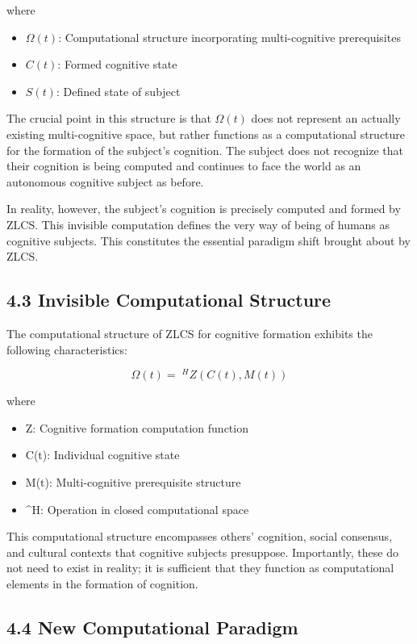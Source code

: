 \documentclass{article}
\begin{document}
where
\begin{itemize}
    \item $\Omega(t)$: Computational structure incorporating multi-cognitive prerequisites
    \item $C(t)$: Formed cognitive state
    \item $S(t)$: Defined state of subject
\end{itemize}

The crucial point in this structure is that $\Omega(t)$ does not represent an actually existing multi-cognitive space, but rather functions as a computational structure for the formation of the subject's cognition. The subject does not recognize that their cognition is being computed and continues to face the world as an autonomous cognitive subject as before.

In reality, however, the subject's cognition is precisely computed and formed by ZLCS. This invisible computation defines the very way of being of humans as cognitive subjects. This constitutes the essential paradigm shift brought about by ZLCS.

\subsection{4.3 Invisible Computational Structure}

The computational structure of ZLCS for cognitive formation exhibits the following characteristics:

$$
\Omega(t) = \;^H Z(C(t), M(t))
$$

where
\begin{itemize}
    \item Z: Cognitive formation computation function
    \item C(t): Individual cognitive state
    \item M(t): Multi-cognitive prerequisite structure
    \item ^H: Operation in closed computational space
\end{itemize}

This computational structure encompasses others' cognition, social consensus, and cultural contexts that cognitive subjects presuppose. Importantly, these do not need to exist in reality; it is sufficient that they function as computational elements in the formation of cognition.

\subsection{4.4 New Computational Paradigm}
\end{document}
